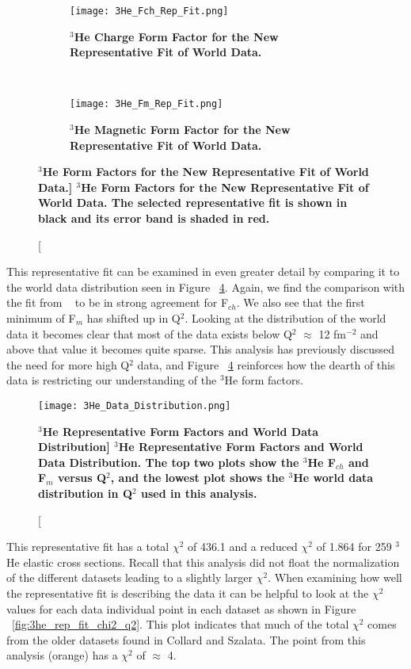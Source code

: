 \begin{figure}[!ht]
\begin{subfigure}{1.\textwidth}
  \centering
  \texttt{[image: 3He\_Fch\_Rep\_Fit.png]}
  \caption{\bf{$^3$He Charge Form Factor for the New Representative Fit of World Data.}}
  \label{fig:3he_fch_rep_fit}
\end{subfigure}\\
\begin{subfigure}{1.\textwidth}
  \centering
  \texttt{[image: 3He\_Fm\_Rep\_Fit.png]}
  \caption{\bf{$^3$He Magnetic Form Factor for the New Representative Fit of World Data.}}
  \label{fig:3he_fm_rep_fit}
\end{subfigure}
\caption[\bf{$^3$He Form Factors for the New Representative Fit of World Data.}] {
{\bf{$^3$He Form Factors for the New Representative Fit of World Data.}} The selected representative fit is shown in black and its error band is shaded in red.}
\label{fig:3he_rep_fit}
\end{figure}

This representative fit can be examined in even greater detail by comparing it to the world data distribution seen in Figure ~\ref{fig:3he_data_distribution}. Again, we find the comparison with the fit from ~\cite{Article:Amroun} to be in strong agreement for F$_{ch}$. We also see that the first minimum of F$_m$ has shifted up in Q$^2$. Looking at the distribution of the world data it becomes clear that most of the data exists below Q$^2$ $\approx$ 12 fm$^{-2}$ and above that value it becomes quite sparse. This analysis has previously discussed the need for more high Q$^2$ data, and Figure ~\ref{fig:3he_data_distribution} reinforces how the dearth of this data is restricting our understanding of the $^3$He form factors.

\begin{figure}[!ht]
	\begin{center}
	\texttt{[image: 3He\_Data\_Distribution.png]}
	\end{center}
	\caption[\bf{$^3$He Representative Form Factors and World Data Distribution}]{
	{\bf{$^3$He Representative Form Factors and World Data Distribution.}} The top two plots show the $^3$He F$_{ch}$ and F$_m$ versus Q$^2$, and the lowest plot shows the $^3$He world data distribution in Q$^2$ used in this analysis.}
	\label{fig:3he_data_distribution}
\end{figure}

This representative fit has a total $\chi^2$ of 436.1 and a reduced $\chi^2$ of 1.864 for 259 $^3$He elastic cross sections. Recall that this analysis did not float the normalization of the different datasets leading to a slightly larger $\chi^2$. When examining how well the representative fit is describing the data it can be helpful to look at the $\chi^2$ values for each data individual point in each dataset as shown in Figure ~\ref{fig:3he_rep_fit_chi2_q2}. This plot indicates that much of the total $\chi^2$ comes from the older datasets found in Collard and Szalata. The point from this analysis (orange) has a $\chi^2$ of $\approx$ 4. 

